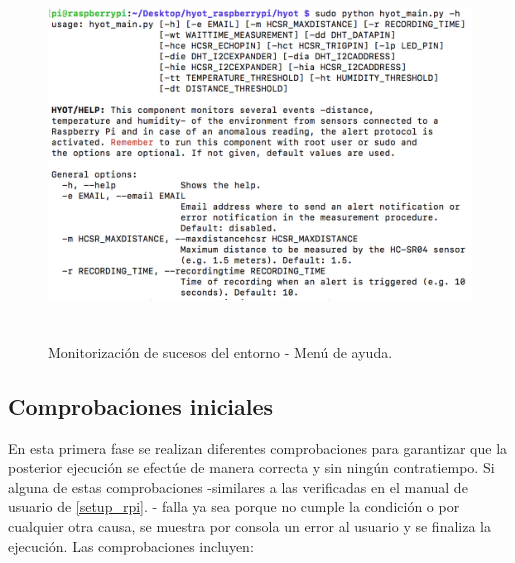\documentclass[12pt,a4paper, twoside]{report}
\begin{document}
	\begin{figure}[!ht]   
		\caption{Monitorización de sucesos del entorno - Menú de ayuda.} 
		\begin{center} 
			\includegraphics[width=15cm,height=9cm]{Images/userGuide/monitoring/help} \\
			\label{fig:userguide_monitoring_help} 
		\end{center}  
	\end{figure}
	
	\newpage
	
	 \subsection{Comprobaciones iniciales}
	 	 
	 En esta primera fase se realizan diferentes comprobaciones para garantizar que la posterior ejecución se efectúe de manera correcta y sin ningún contratiempo. Si alguna de estas comprobaciones -similares a las verificadas en el manual de usuario de \ref{setup_rpi}. - falla ya sea porque no cumple la condición o por cualquier otra causa, se muestra por consola un error al usuario y se finaliza la ejecución. Las comprobaciones incluyen:
	 
\end{document}
